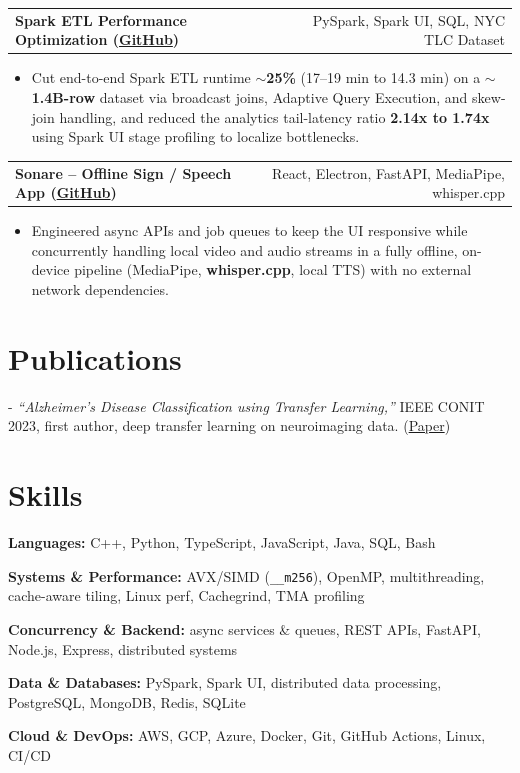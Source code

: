 \documentclass[letterpaper,11pt]{article}
\makeatletter
\newcommand{\projItem}[2]{%
  \vspace{2pt}
  \begin{tabular*}{\textwidth}{@{}l@{\extracolsep{\fill}}r@{}}
    \textbf{#1} & #2 \\
  \end{tabular*}\par\vspace{-3pt}
}
\newcommand{\skillLine}[2]{\textbf{#1:} #2\par\vspace{1.5pt}}
\newcommand{\inlineBlock}[1]{{\setlength{\leftskip}{0.18in}\small #1\par}}
\makeatother
\begin{document}
\projItem{Spark ETL Performance Optimization {\normalfont\small(\href{https://github.com/Deva-1903/Spark-ETL-Optimization}{GitHub})}}{PySpark, Spark UI, SQL, NYC TLC Dataset}
\begin{itemize}
  \item Cut end-to-end Spark ETL runtime \textbf{$\sim$25\%} (17--19 min to 14.3 min) on a \textbf{$\sim$1.4B-row} dataset via broadcast joins, Adaptive Query Execution, and skew-join handling, and reduced the analytics tail-latency ratio \textbf{2.14x to 1.74x} using Spark UI stage profiling to localize bottlenecks.
\end{itemize}

\projItem{Sonare -- Offline Sign / Speech App {\normalfont\small(\href{https://github.com/Deva-1903/Qualcomm-Sep25-Team-Sonare}{GitHub})}}{React, Electron, FastAPI, MediaPipe, whisper.cpp}
\begin{itemize}
  \item Engineered async APIs and job queues to keep the UI responsive while concurrently handling local video and audio streams in a fully offline, on-device pipeline (MediaPipe, \textbf{whisper.cpp}, local TTS) with no external network dependencies.
\end{itemize}

\section{Publications}
\vspace{2pt}
\inlineBlock{- \textit{``Alzheimer's Disease Classification using Transfer Learning,''} IEEE CONIT 2023, first author, deep transfer learning on neuroimaging data. {\normalfont\small(\href{https://ieeexplore.ieee.org/document/10205760}{Paper})}}

\section{Skills}
\skillLine{Languages}{C++, Python, TypeScript, JavaScript, Java, SQL, Bash}
\skillLine{Systems \& Performance}{AVX/SIMD (\texttt{\_\_m256}), OpenMP, multithreading, cache-aware tiling, Linux perf, Cachegrind, TMA profiling}
\skillLine{Concurrency \& Backend}{async services \& queues, REST APIs, FastAPI, Node.js, Express, distributed systems}
\skillLine{Data \& Databases}{PySpark, Spark UI, distributed data processing, PostgreSQL, MongoDB, Redis, SQLite}
\skillLine{Cloud \& DevOps}{AWS, GCP, Azure, Docker, Git, GitHub Actions, Linux, CI/CD}
\end{document}
